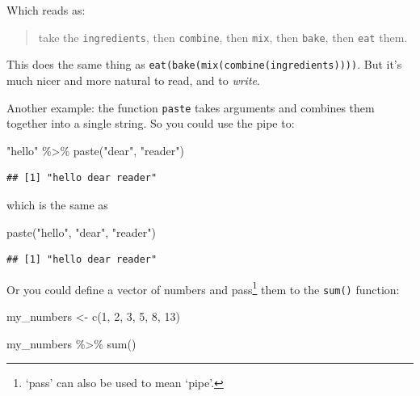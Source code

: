 \documentclass[
]{book}
\newenvironment{Shaded}{\begin{snugshade}}{\end{snugshade}}
\newcommand{\DecValTok}[1]{\textcolor[rgb]{0.00,0.00,0.81}{#1}}
\newcommand{\FunctionTok}[1]{\textcolor[rgb]{0.00,0.00,0.00}{#1}}
\newcommand{\NormalTok}[1]{#1}
\newcommand{\OtherTok}[1]{\textcolor[rgb]{0.56,0.35,0.01}{#1}}
\newcommand{\SpecialCharTok}[1]{\textcolor[rgb]{0.00,0.00,0.00}{#1}}
\newcommand{\StringTok}[1]{\textcolor[rgb]{0.31,0.60,0.02}{#1}}
\begin{document}
Which reads as:

\begin{quote}
take the \texttt{ingredients}, then \texttt{combine}, then \texttt{mix}, then \texttt{bake}, then \texttt{eat} them.
\end{quote}

This does the same thing as \texttt{eat(bake(mix(combine(ingredients))))}. But it's much nicer and more natural to read, and to \emph{write}.

Another example: the function \texttt{paste} takes arguments and combines them together into a single string. So you could use the pipe to:

\begin{Shaded}
\begin{Highlighting}[]
\StringTok{"hello"} \SpecialCharTok{\%\textgreater{}\%} \FunctionTok{paste}\NormalTok{(}\StringTok{"dear"}\NormalTok{, }\StringTok{"reader"}\NormalTok{)}
\end{Highlighting}
\end{Shaded}

\begin{verbatim}
## [1] "hello dear reader"
\end{verbatim}

which is the same as

\begin{Shaded}
\begin{Highlighting}[]
\FunctionTok{paste}\NormalTok{(}\StringTok{"hello"}\NormalTok{, }\StringTok{"dear"}\NormalTok{, }\StringTok{"reader"}\NormalTok{)}
\end{Highlighting}
\end{Shaded}

\begin{verbatim}
## [1] "hello dear reader"
\end{verbatim}

Or you could define a vector of numbers and pass\footnote{`pass' can also be used to mean `pipe'.} them to the \texttt{sum()} function:

\begin{Shaded}
\begin{Highlighting}[]
\NormalTok{my\_numbers }\OtherTok{\textless{}{-}} \FunctionTok{c}\NormalTok{(}\DecValTok{1}\NormalTok{, }\DecValTok{2}\NormalTok{, }\DecValTok{3}\NormalTok{, }\DecValTok{5}\NormalTok{, }\DecValTok{8}\NormalTok{, }\DecValTok{13}\NormalTok{)}

\NormalTok{my\_numbers }\SpecialCharTok{\%\textgreater{}\%} \FunctionTok{sum}\NormalTok{()}
\end{Highlighting}
\end{Shaded}
\end{document}
